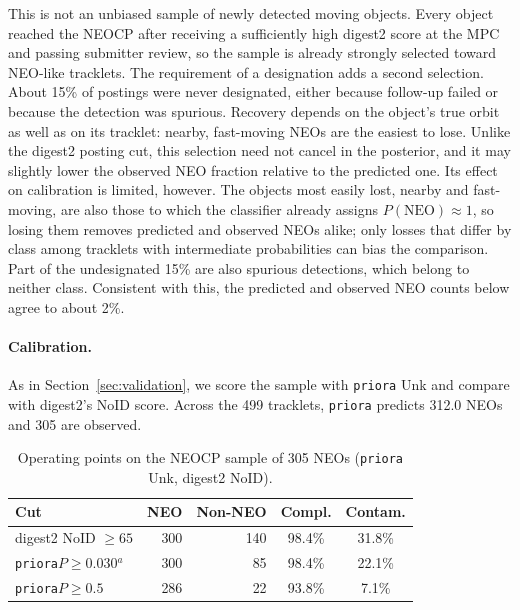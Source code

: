 \documentclass[linenumbers,twocolumn]{aastex701}
\newcommand{\priora}{{\tt priora}\xspace} %
\begin{document}
This is not an unbiased sample of newly detected moving objects. Every object
reached the NEOCP after receiving a sufficiently high digest2 score at the MPC
and passing submitter review, so the sample is already strongly selected toward
NEO-like tracklets. The requirement of a designation adds a second
selection. About 15\% of postings were never designated, either because
follow-up failed or because the detection was spurious. Recovery depends on
the object's true orbit as well as on its tracklet: nearby, fast-moving NEOs
are the easiest to lose. Unlike the digest2 posting cut, this selection need
not cancel in the posterior, and it may slightly lower the observed NEO
fraction relative to the predicted one. Its effect on calibration is
limited, however. The objects most easily lost, nearby and fast-moving, are
also those to which the classifier already assigns $P(\mathrm{NEO})\approx1$,
so losing them removes predicted and observed NEOs alike; only losses that
differ by class among tracklets with intermediate probabilities can bias the
comparison. Part of the undesignated 15\% are also spurious detections, which
belong to neither class. Consistent with this, the predicted and observed NEO
counts below agree to about 2\%.

\paragraph{Calibration.}
As in Section~\ref{sec:validation}, we score the
sample with \priora Unk and compare with digest2's NoID score. Across the 499
tracklets, \priora predicts 312.0 NEOs and 305 are observed.

\begin{table}
\centering
\caption{Operating points on the NEOCP sample of 305 NEOs (\priora Unk,
digest2 NoID).}
\label{tab:neocp}
\setlength{\tabcolsep}{4pt}
\begin{tabular}{lrrcc}
\hline
Cut & NEO & Non-NEO & Compl. & Contam. \\
\hline
digest2 NoID $\geq65$   & 300 & 140 & 98.4\% & 31.8\% \\
\priora $P\geq0.030$$^a$   & 300 & 85  & 98.4\% & 22.1\% \\
\priora $P\geq0.5$         & 286 & 22  & 93.8\% & 7.1\% \\
\hline
\end{tabular}
\end{table}
\end{document}
